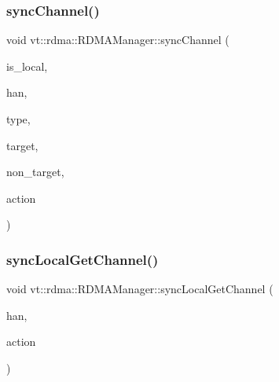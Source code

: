 \mbox{\label{structvt_1_1rdma_1_1_r_d_m_a_manager_a4dd6beec7e4e1d3cc4c0ad3e8d0e7837}} 
\subsubsection{\texorpdfstring{sync\+Channel()}{syncChannel()}}
{\footnotesize\ttfamily void vt\+::rdma\+::\+R\+D\+M\+A\+Manager\+::sync\+Channel (\begin{DoxyParamCaption}\item[{bool const \&}]{is\+\_\+local,  }\item[{\hyperlink{namespacevt_a10442579ec4e7ebef223818e64bcf908}{R\+D\+M\+A\+\_\+\+Handle\+Type} const \&}]{han,  }\item[{\hyperlink{namespacevt_1_1rdma_ac848e1d9da43db6294bd06f83e5d3946}{R\+D\+M\+A\+\_\+\+Type\+Type} const \&}]{type,  }\item[{\hyperlink{namespacevt_a866da9d0efc19c0a1ce79e9e492f47e2}{Node\+Type} const \&}]{target,  }\item[{\hyperlink{namespacevt_a866da9d0efc19c0a1ce79e9e492f47e2}{Node\+Type} const \&}]{non\+\_\+target,  }\item[{\hyperlink{namespacevt_ae0a5a7b18cc99d7b732cb4d44f46b0f3}{Action\+Type} const \&}]{action }\end{DoxyParamCaption})\hspace{0.3cm}{\ttfamily [private]}}

\mbox{\label{structvt_1_1rdma_1_1_r_d_m_a_manager_a85e3bd458484375b762492ed0d65d9f5}} 
\subsubsection{\texorpdfstring{sync\+Local\+Get\+Channel()}{syncLocalGetChannel()}\hspace{0.1cm}{\footnotesize\ttfamily [1/2]}}
{\footnotesize\ttfamily void vt\+::rdma\+::\+R\+D\+M\+A\+Manager\+::sync\+Local\+Get\+Channel (\begin{DoxyParamCaption}\item[{\hyperlink{namespacevt_a10442579ec4e7ebef223818e64bcf908}{R\+D\+M\+A\+\_\+\+Handle\+Type} const \&}]{han,  }\item[{\hyperlink{namespacevt_ae0a5a7b18cc99d7b732cb4d44f46b0f3}{Action\+Type} const \&}]{action }\end{DoxyParamCaption})\hspace{0.3cm}{\ttfamily [inline]}}



